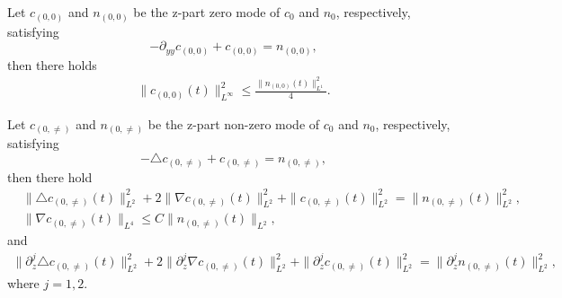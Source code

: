 \documentclass[10pt,a4paper]{amsart}
\begin{document}
	\begin{lemma}\label{lem:ellip_30}
		Let $c_{(0,0)}$ and $n_{(0,0)}$ be the z-part zero mode of $c_0$ and $n_0$,
		respectively, satisfying
		$$-\partial_{yy} c_{(0,0 )}+c_{(0,0 )}=n_{(0,0)},$$
		then there holds
		\begin{equation*}
			\begin{aligned}
				\|c_{(0,0)}(t)\|^2_{L^{\infty}}\leq \frac{\|n_{(0,0)}(t)\|^2_{L^1}}{4}.    		
			\end{aligned}
		\end{equation*}
	\end{lemma}

	\begin{lemma}\label{lem:ellip_4}
		Let $c_{(0,\neq)}$ and $n_{(0,\neq)}$ be the z-part non-zero mode of $c_0$ and $n_0$,
		respectively, satisfying
		$$-\triangle c_{(0,\neq )}+c_{(0,\neq )}=n_{(0,\neq )},$$
		then there hold
		\begin{align*}
			&\|\triangle c_{(0,\neq )}(t)\|^2_{L^2}
			+2\|\nabla c_{(0,\neq )}(t)\|^2_{L^2}
			+\|c_{(0,\neq )}(t)\|^2_{L^2}=\|n_{(0,\neq )}(t)\|^2_{L^2},\\
			&\|\nabla c_{(0,\neq )}(t)\|_{L^4}\leq C\|n_{(0,\neq )}(t)\|_{L^2},
		\end{align*}
		and
		\begin{equation*}
			\begin{aligned}
				\|\partial_z^j\triangle c_{(0,\neq )}(t)\|^2_{L^2}
				+2\|\partial_z^j\nabla c_{(0,\neq )}(t)\|^2_{L^2}
				+\|\partial_z^j c_{(0,\neq )}(t)\|^2_{L^2}=\|\partial_z^jn_{(0,\neq )}(t)\|^2_{L^2},
			\end{aligned}
		\end{equation*}
		where $j=1,2.$
	\end{lemma}
\end{document}
